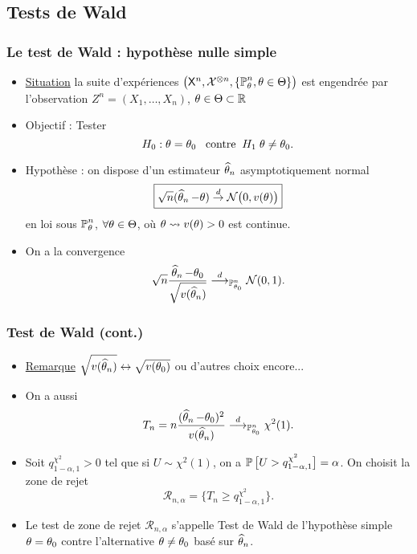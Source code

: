 \subsection{Tests de Wald}
\begin{frame}
\frametitle{Le test de Wald : hypothèse nulle simple}
\begin{itemize}
\item \underline{Situation} la suite d'expériences $\big(\mathsf{X}^n, \mathcal{X}^{\otimes n},\{\operatorname{{\mathbb P}}_\theta^n,\theta \in \Theta\}\big)$ est engendrée par l'observation $Z^n= (X_1,\dots,X_n)$, $\theta \in \Theta \subset \operatorname{{\mathbb R}}$
\item \alert{Objectif} : Tester
$$H_0:\theta = \theta_0\;\;\;\text{contre}\;\;H_1 \;\theta\neq \theta_0.$$
\item \alert{Hypothèse} : on dispose d'un estimateur $\operatorname{\widehat \theta_{\mathnormal{n}}}$ \alert{asymptotiquement normal}
$$\boxed{\sqrt{n}(\operatorname{\widehat \theta_{\mathnormal{n}}}-\theta)\stackrel{d}{\rightarrow}{\mathcal N}\big(0,v(\theta)\big)}$$
en loi sous $\operatorname{{\mathbb P}}_{\theta}^n$, $\forall \theta \in \Theta$, où $\theta \leadsto v(\theta) >0$ est continue.
\item On a \alert{la convergence}
$$\sqrt{n}\frac{\operatorname{\widehat \theta_{\mathnormal{n}}}-\theta_0}{\sqrt{v(\operatorname{\widehat \theta_{\mathnormal{n}}})}}\stackrel{d}{\longrightarrow}_{\operatorname{{\mathbb P}}_{\theta_0}^n} {\mathcal N}(0,1).$$
\end{itemize}
\end{frame}

\begin{frame}
\frametitle{Test de Wald (cont.)}
\begin{itemize}
\item \underline{Remarque} $\sqrt{v(\operatorname{\widehat \theta_{\mathnormal{n}}})} \leftrightarrow \sqrt{v(\theta_0)}$ ou d'autres choix encore...
\item On a aussi
$$T_n = n\frac{(\operatorname{\widehat \theta_{\mathnormal{n}}}-\theta_0)^2}{v(\operatorname{\widehat \theta_{\mathnormal{n}}})} \stackrel{d}{\longrightarrow}_{\operatorname{{\mathbb P}}_{\theta_0}^n} \chi^2(1).$$
\item Soit $q_{1-\alpha,1}^{\chi^2} >0$ tel que si $U \sim \chi^2(1)$, on a $\operatorname{{\mathbb P}}\big[U > q_{1-\alpha,1}^{\chi^2}\big]=\alpha$. On \alert{choisit la zone de rejet}
$${\mathcal R}_{n,\alpha} = \big\{T_n\geq q_{1-\alpha,1}^{\chi^2}\big\}.$$
\item Le test de zone de rejet ${\mathcal R}_{n,\alpha}$ s'appelle \alert{Test de Wald de l'hypothèse simple $\theta=\theta_0$ contre l'alternative $\theta \neq \theta_0$ basé sur $\operatorname{\widehat \theta_{\mathnormal{n}}}$.}
\end{itemize}
\end{frame}

